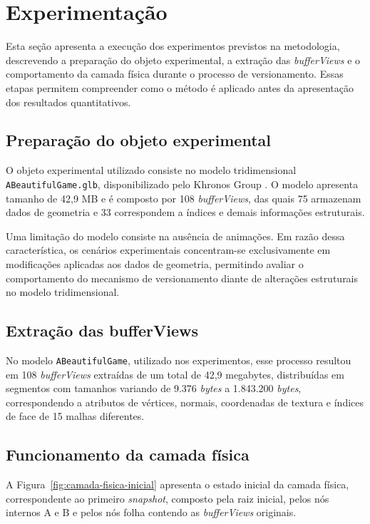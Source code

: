 
\chapter{Experimentação}\label{cap:experimentos}

Esta seção apresenta a execução dos experimentos previstos na metodologia,
descrevendo a preparação do objeto experimental, a extração das
\textit{bufferViews} e o comportamento da camada física durante o processo de
versionamento. Essas etapas permitem compreender como o método é aplicado antes da
apresentação dos resultados quantitativos.

\section{Preparação do objeto experimental}

O objeto experimental utilizado consiste no modelo tridimensional
\texttt{ABeautifulGame.glb}, disponibilizado pelo Khronos Group
\cite{KhronosSamples2026}. O modelo apresenta tamanho de 42,9 MB e é composto por
108 \textit{bufferViews}, das quais 75 armazenam dados de geometria e 33
correspondem a índices e demais informações estruturais.

Uma limitação do modelo consiste na ausência de animações. Em razão dessa
característica, os cenários experimentais concentram-se exclusivamente em
modificações aplicadas aos dados de geometria, permitindo avaliar o comportamento do
mecanismo de versionamento diante de alterações estruturais no modelo
tridimensional.

\section{Extração das bufferViews}

No modelo \texttt{ABeautifulGame}, utilizado nos experimentos, esse processo
resultou em 108 \textit{bufferViews} extraídas de um total de 42,9 megabytes,
distribuídas em segmentos com tamanhos variando de 9.376 \textit{bytes} a 1.843.200
\textit{bytes}, correspondendo a atributos de vértices, normais, coordenadas de
textura e índices de face de 15 malhas diferentes.

\section{Funcionamento da camada física}

A Figura~\ref{fig:camada-fisica-inicial} apresenta o estado inicial da camada
física, correspondente ao primeiro \textit{snapshot}, composto pela raiz inicial,
pelos nós internos A e B e pelos nós folha contendo as \textit{bufferViews}
originais.

